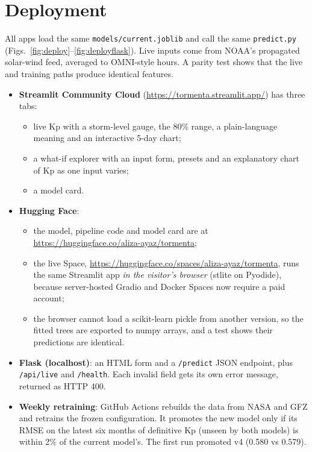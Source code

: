 \documentclass[11pt,a4paper]{article}
\newcommand{\code}[1]{\texttt{\small #1}}
\begin{document}
\section{Deployment}
All apps load the same \code{models/current.joblib} and call the same \code{predict.py}
(Figs.~\ref{fig:deploy}--\ref{fig:deployflask}). Live inputs come from NOAA's propagated solar-wind feed, averaged to OMNI-style hours. A
parity test shows that the live and training paths produce identical features.
\begin{itemize}
\item \textbf{Streamlit Community Cloud} (\url{https://tormenta.streamlit.app/}) has three tabs:
  \begin{itemize}
  \item live Kp with a storm-level gauge, the 80\% range, a plain-language meaning and an interactive
  5-day chart;
  \item a what-if explorer with an input form, presets and an explanatory chart of Kp as one input varies;
  \item a model card.
  \end{itemize}
\item \textbf{Hugging Face}:
  \begin{itemize}
  \item the model, pipeline code and model card are at \url{https://huggingface.co/aliza-ayaz/tormenta};
  \item the live Space, \url{https://huggingface.co/spaces/aliza-ayaz/tormenta}, runs the same Streamlit app
  \emph{in the visitor's browser} (stlite on Pyodide), because server-hosted Gradio and Docker Spaces now require
  a paid account;
  \item the browser cannot load a scikit-learn pickle from another version, so the fitted trees are exported to
  numpy arrays, and a test shows their predictions are identical.
  \end{itemize}
\item \textbf{Flask (localhost)}: an HTML form and a \code{/predict} JSON endpoint, plus \code{/api/live} and
\code{/health}. Each invalid field gets its own error message, returned as HTTP 400.
\item \textbf{Weekly retraining}: GitHub Actions rebuilds the data from NASA and GFZ and retrains the frozen
configuration. It promotes the new model only if its RMSE on the latest six months of definitive Kp (unseen by both
models) is within 2\% of the current model's. The first run promoted v4 (0.580 vs 0.579).
\end{itemize}
\end{document}
